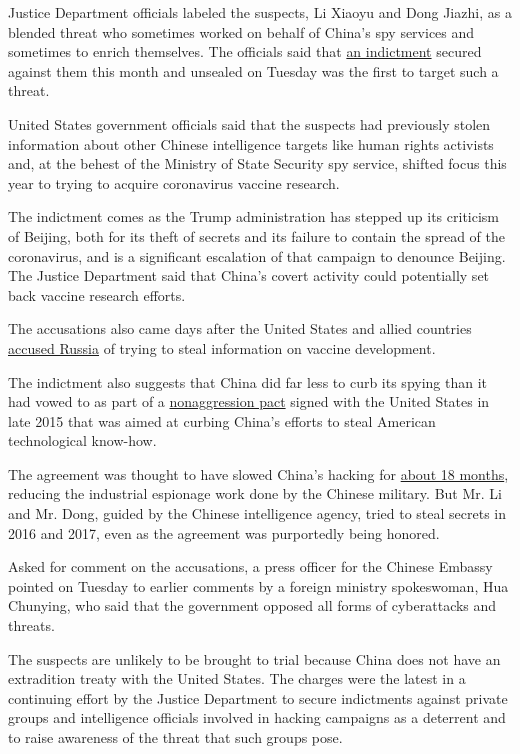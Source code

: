 Justice Department officials labeled the suspects, Li Xiaoyu and Dong
Jiazhi, as a blended threat who sometimes worked on behalf of China's
spy services and sometimes to enrich themselves. The officials said that
\href{https://www.courtlistener.com/recap/gov.uscourts.waed.91446/gov.uscourts.waed.91446.15.0.pdf}{an
indictment} secured against them this month and unsealed on Tuesday was
the first to target such a threat.

United States government officials said that the suspects had previously
stolen information about other Chinese intelligence targets like human
rights activists and, at the behest of the Ministry of State Security
spy service, shifted focus this year to trying to acquire coronavirus
vaccine research.

The indictment comes as the Trump administration has stepped up its
criticism of Beijing, both for its theft of secrets and its failure to
contain the spread of the coronavirus, and is a significant escalation
of that campaign to denounce Beijing. The Justice Department said that
China's covert activity could potentially set back vaccine research
efforts.

The accusations also came days after the United States and allied
countries
\href{https://www.nytimes.com/2020/07/16/us/politics/vaccine-hacking-russia.html}{accused
Russia} of trying to steal information on vaccine development.

The indictment also suggests that China did far less to curb its spying
than it had vowed to as part of a
\href{https://www.nytimes.com/2015/09/26/world/asia/xi-jinping-white-house.html}{nonaggression
pact} signed with the United States in late 2015 that was aimed at
curbing China's efforts to steal American technological know-how.

The agreement was thought to have slowed China's hacking for
\href{https://www.nytimes.com/2018/11/29/us/politics/china-trump-cyberespionage.html}{about
18 months}, reducing the industrial espionage work done by the Chinese
military. But Mr. Li and Mr. Dong, guided by the Chinese intelligence
agency, tried to steal secrets in 2016 and 2017, even as the agreement
was purportedly being honored.

Asked for comment on the accusations, a press officer for the Chinese
Embassy pointed on Tuesday to earlier comments by a foreign ministry
spokeswoman, Hua Chunying, who said that the government opposed all
forms of cyberattacks and threats.

The suspects are unlikely to be brought to trial because China does not
have an extradition treaty with the United States. The charges were the
latest in a continuing effort by the Justice Department to secure
indictments against private groups and intelligence officials involved
in hacking campaigns as a deterrent and to raise awareness of the threat
that such groups pose.

